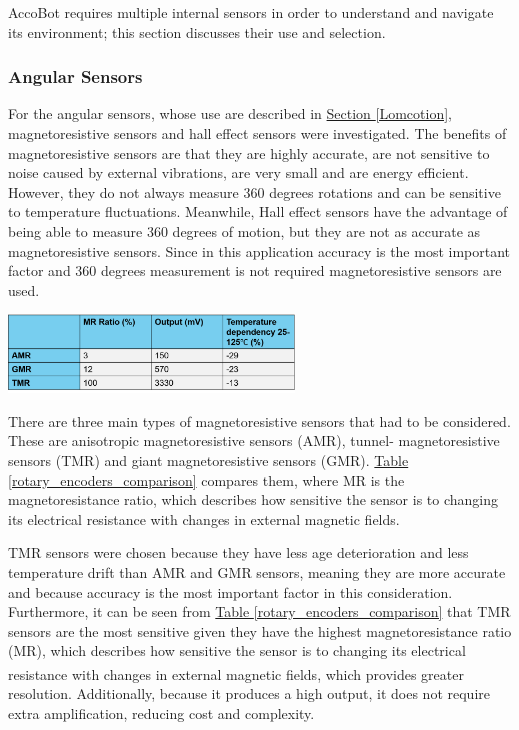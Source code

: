 \documentclass[11pt]{article}		%
\newcommand{\supercite}[1]{\textsuperscript{\cite{#1}}}		%
\newcommand{\tableref}[1]{\hyperref[#1]{Table \ref*{#1}}}     %
\newcommand{\sectref}[1]{\hyperref[#1]{Section \ref*{#1}}}     %
\begin{document}
		AccoBot requires multiple internal sensors in order to understand and navigate its environment; this section discusses their use and selection.
		
		\subsubsection{Angular Sensors}
            		
            For the angular sensors, whose use are described in \sectref{Lomcotion}, magnetoresistive sensors and hall effect sensors were investigated. The benefits of magnetoresistive sensors are that they are highly accurate, are not sensitive to noise caused by external vibrations, are very small and are energy efficient. However, they do not always measure 360 degrees rotations and can be sensitive to temperature fluctuations. Meanwhile, Hall effect sensors have the advantage of being able to measure 360 degrees of motion, but they are not as accurate as magnetoresistive sensors. Since in this application accuracy is the most important factor and 360 degrees measurement is not required magnetoresistive sensors are used.
           \begin{floatingfigure}[r]{0.6\textwidth}
					\centering
					\includegraphics[width=0.57\textwidth] {AMR_comparison table_formatted}
					\label{rotary_encoders_comparison}
			\end{floatingfigure}
            \hspace*{2ex}There are three main types of magnetoresistive sensors that had to be considered. These are anisotropic magnetoresistive sensors (AMR), tunnel- magnetoresistive sensors (TMR) and giant magnetoresistive sensors (GMR). \tableref{rotary_encoders_comparison} compares them, where MR is the magnetoresistance ratio, which describes how sensitive the sensor is to changing its electrical resistance with changes in external magnetic fields.
            \begin{floatingfigure}[r]{0pt} \end{floatingfigure}
            \hspace*{2ex}TMR sensors were chosen because they have less age deterioration and less temperature drift than AMR and GMR sensors, meaning they are more accurate and because accuracy is the most important factor in this consideration. Furthermore, it can be seen from \tableref{rotary_encoders_comparison} that TMR sensors are the most sensitive given they have the highest magnetoresistance ratio (MR), which describes how sensitive the sensor is to changing its electrical resistance with changes in external magnetic fields\supercite{magnetoresistance}, which provides greater resolution. Additionally, because it produces a high output, it does not require extra amplification, reducing cost and complexity.
\end{document}
